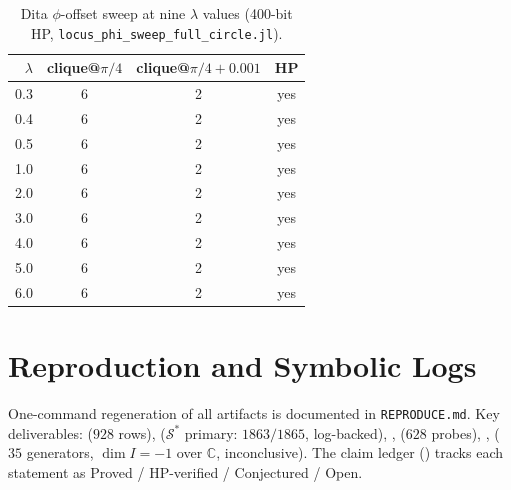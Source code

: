 \documentclass[onecolumn]{IEEEtran}
\begin{document}
\begin{table}[ht]
\caption{Dita $\phi$-offset sweep at nine $\lambda$ values (400-bit HP, \texttt{locus\_phi\_sweep\_full\_circle.jl}).}
\label{tab:phisweep}
\centering
\small
\begin{tabular}{@{}rccc@{}}
\toprule
$\lambda$ & clique@$\pi/4$ & clique@$\pi/4{+}0.001$ & HP \\
\midrule
0.3 & 6 & 2 & yes \\
0.4 & 6 & 2 & yes \\
0.5 & 6 & 2 & yes \\
1.0 & 6 & 2 & yes \\
2.0 & 6 & 2 & yes \\
3.0 & 6 & 2 & yes \\
4.0 & 6 & 2 & yes \\
5.0 & 6 & 2 & yes \\
6.0 & 6 & 2 & yes \\
\bottomrule
\end{tabular}
\end{table}

\section{Reproduction and Symbolic Logs}
\label{app:reproduce}
One-command regeneration of all artifacts is documented in \texttt{REPRODUCE.md}.
Key deliverables:  ($928$ rows),  ($\mathcal{S}^*$ primary: $1863/1865$, log-backed), ,  ($628$ probes), ,  ($35$ generators, $\dim I=-1$ over $\mathbb{C}$, inconclusive).
The claim ledger () tracks each statement as Proved / HP-verified / Conjectured / Open.
\end{document}
